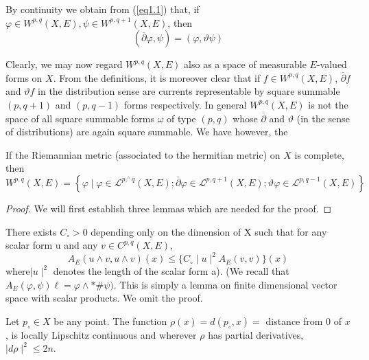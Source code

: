  By continuity we obtain from (\ref{eq1.1}) that, if $\varphi \in W^{p,q}
 (X, E), \psi \in W^{p,q+1} (X ,E)$, then 
 $$
 (\overline{\partial} \varphi, \psi) = ( \varphi, \vartheta \psi)
 $$
 
 Clearly, we may now regard $W^{p ,q} (X ,E)$ also as a space of
 measurable $E$-valued forms on $X$. From the definitions, it is moreover
 clear that if $f \in W^{p,q} (X, E)$, $\overline{\partial}f$ and
 $\vartheta f $ in the distribution sense are currents representable by
 square summable $(p ,q + 1)$ and $(p ,q - 1)$ forms respectively. In
 general $W^{ p,q} (X, E)$ is not the space of all square summable
 forms $\omega$ of type $(p,q)$ whose $\overline{\partial}$ and
 $\vartheta$ (in the sense of distributions) are again square
 summable. We have however, the 
 
 \begin{theorem}%
   If the Riemannian metric (associated to the hermitian metric) on $X$
   is complete, then 
   {\fontsize{10}{12}\selectfont
   $$
   W^{p,q} (X, E)= \left\{ \varphi \mid \varphi \in \mathcal{L}^{p,^\wedge
     q} (X, E); \overline{\partial} \varphi \in
   \mathcal{L}^{p,q+1}(X ,E); \vartheta \varphi \in
   \mathcal{L}^{p,q-1} (X, E) \right\}
   $$}\relax 
 \end{theorem}

\begin{proof}
  We will first establish three lemmas which are needed for the
  proof.
\end{proof}

\begin{alphlemma}\label{chap1:alphlemmaA}%
  There exists $C_\circ > 0$ depending only on the dimension of X
  such that for any scalar form u and any $v \in C^{p,q} (X,
  E)$, 
  $$ 
  A_E(u \wedge {v}, u \wedge  {v})(x) \leq \{C_\circ \mid u
  \mid^2 A_E  {(v, v)}\} (x) 
  $$
where\pageoriginale $\mid u \mid^2$ denotes the length of the scalar
form a). (We recall that $A_E(\varphi , \psi)\ell = \varphi \wedge \ast \#
  \psi)$. This is simply a lemma on finite dimensional vector space
  with scalar products. We omit the proof. 
\end{alphlemma}


\begin{alphlemma}\label{chap1:alphlemmaB}%
  Let $ p_\circ \in X$ be any point. The function $\rho(x) = d
  (p_\circ, x)=$ distance from $0$ of $x$, is locally Lipschitz continuous
  and wherever $\rho$ has partial derivatives, $\mid d \rho \mid^2 \leq
  2n.$ 
\end{alphlemma}

